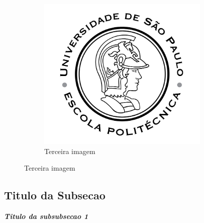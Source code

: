 \begin{figure}[h!]
    \begin{subfigure}{0.5\textwidth}
        \includegraphics[width=0.9\textwidth]{imagens/Poli.png}
        \caption{Terceira imagem}
        \label{fig:poli3}
    \end{subfigure}
    \label{fig:variasImagens}
\end{figure}
\subsection{Titulo da Subsecao}\label{subsec:conteudo1}
\blindtext

\noindent\textbf{\textit{Titulo da subsubsecao 1}}

\blindtext